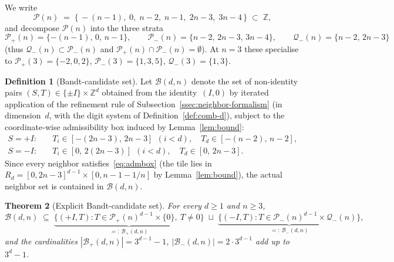 \documentclass{amsart}
\newtheorem{theorem}{Theorem}[section]
\theoremstyle{definition}
\newtheorem{definition}[theorem]{Definition}
\theoremstyle{remark}
\newcommand{\Z}{\mathbb{Z}}
\begin{document}
We write
\begin{equation}\label{eq:offset-alphabet}
  \mathcal{P}(n) \;=\; \bigl\{\, -(n{-}1),\; 0,\; n{-}2,\; n{-}1,\;
                                  2n{-}3,\; 3n{-}4 \,\bigr\}
  \;\subset\; \Z,
\end{equation}
and decompose $\mathcal{P}(n)$ into the three strata
\[
  \mathcal{P}_+(n) = \{-(n{-}1),\, 0,\, n{-}1\},\qquad
  \mathcal{P}_-(n) = \{n{-}2,\, 2n{-}3,\, 3n{-}4\},\qquad
  \mathcal{Q}_-(n) = \{n{-}2,\, 2n{-}3\}
\]
(thus $\mathcal{Q}_-(n) \subset \mathcal{P}_-(n)$ and
$\mathcal{P}_+(n) \cap \mathcal{P}_-(n) = \emptyset$).
At $n = 3$ these specialise to
$\mathcal{P}_+(3) = \{-2, 0, 2\}$, $\mathcal{P}_-(3) = \{1, 3, 5\}$,
$\mathcal{Q}_-(3) = \{1, 3\}$.

\begin{definition}[Bandt-candidate set]\label{def:bandt-set}
Let $\mathcal{B}(d, n)$ denote the set of non-identity pairs
$(S, T) \in \{\pm I\} \times \Z^d$ obtained from the
identity~$(I, 0)$ by iterated application of the
refinement rule of Subsection~\ref{ssec:neighbor-formalism} (in dimension~$d$,
with the digit system of Definition~\ref{def:comb-d}),
subject to the coordinate-wise admissibility box induced by
Lemma~\ref{lem:bound}:
\begin{equation}\label{eq:admbox}
  \begin{aligned}
    S = +I:\quad & T_i \in [-(2n{-}3),\, 2n{-}3]\ \ (i<d), \quad
                   T_d \in [-(n{-}2),\, n{-}2],\\
    S = -I:\quad & T_i \in [0,\, 2(2n{-}3)]\ \ (i<d), \quad
                   T_d \in [0,\, 2n{-}3].
  \end{aligned}
\end{equation}
Since every neighbor satisfies~\eqref{eq:admbox} (the tile lies in
$R_d = [0, 2n{-}3]^{d-1} \times [0, n{-}1{-}1/n]$ by
Lemma~\ref{lem:bound}), the actual neighbor set is
contained in $\mathcal{B}(d, n)$.
\end{definition}

\begin{theorem}[Explicit Bandt-candidate set]\label{thm:bandt-explicit}
For every $d \ge 1$ and $n \ge 3$,
\begin{equation}\label{eq:bandt-explicit}
  \mathcal{B}(d, n) \;\subseteq\;
  \underbrace{\bigl\{(+I, T) : T \in
                 \mathcal{P}_+(n)^{d-1} \times \{0\},\ T \neq 0\bigr\}}_{=:\,\mathcal{B}_+(d, n)}
  \;\sqcup\;
  \underbrace{\bigl\{(-I, T) : T \in
                 \mathcal{P}_-(n)^{d-1} \times \mathcal{Q}_-(n)\bigr\}}_{=:\,\mathcal{B}_-(d, n)},
\end{equation}
and the cardinalities $|\mathcal{B}_+(d, n)| = 3^{d-1} - 1$,
$|\mathcal{B}_-(d, n)| = 2 \cdot 3^{d-1}$ add up to $3^d - 1$.
\end{theorem}
\end{document}
